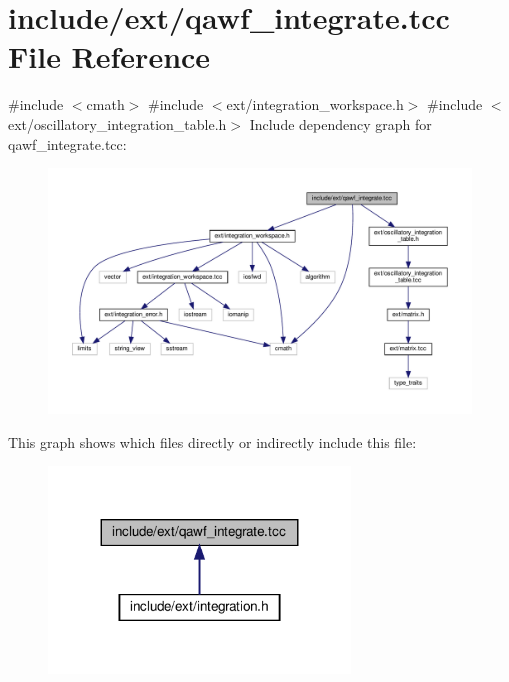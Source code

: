 \hypertarget{qawf__integrate_8tcc}{}\section{include/ext/qawf\+\_\+integrate.tcc File Reference}
\label{qawf__integrate_8tcc}
{\ttfamily \#include $<$cmath$>$}\newline
{\ttfamily \#include $<$ext/integration\+\_\+workspace.\+h$>$}\newline
{\ttfamily \#include $<$ext/oscillatory\+\_\+integration\+\_\+table.\+h$>$}\newline
Include dependency graph for qawf\+\_\+integrate.\+tcc\+:
\nopagebreak
\begin{figure}[H]
\begin{center}
\leavevmode
\includegraphics[width=350pt]{qawf__integrate_8tcc__incl}
\end{center}
\end{figure}
This graph shows which files directly or indirectly include this file\+:
\nopagebreak
\begin{figure}[H]
\begin{center}
\leavevmode
\includegraphics[width=227pt]{qawf__integrate_8tcc__dep__incl}
\end{center}
\end{figure}
